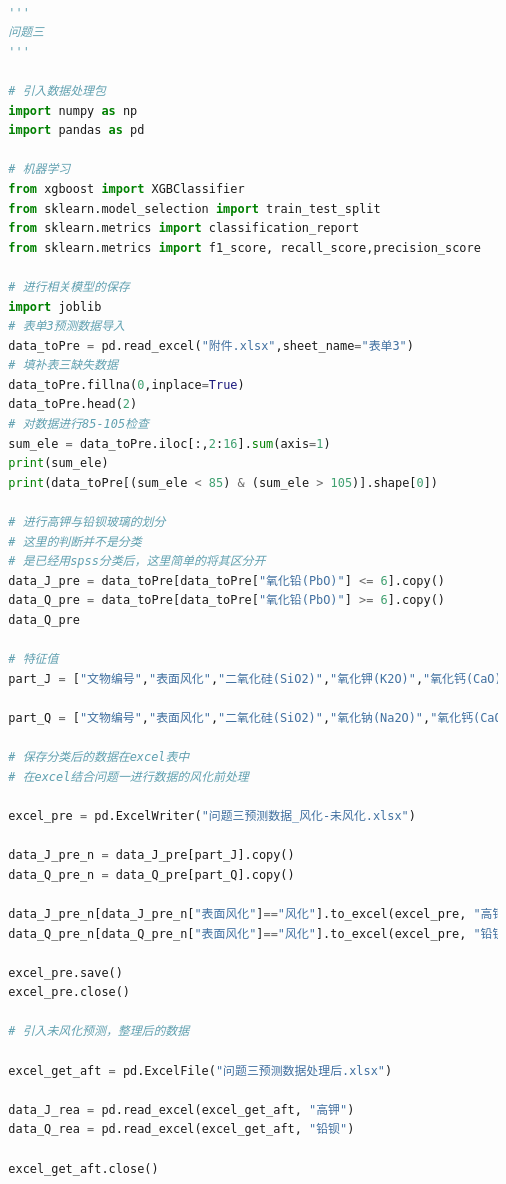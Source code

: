 \documentclass[withoutpreface,bwprint]{cumcmthesis} %
\begin{document}
\begin{appendices}
\begin{lstlisting}[language=python]
  
  '''
  问题三
  '''
  
  # 引入数据处理包
  import numpy as np
  import pandas as pd
  
  # 机器学习
  from xgboost import XGBClassifier
  from sklearn.model_selection import train_test_split
  from sklearn.metrics import classification_report
  from sklearn.metrics import f1_score, recall_score,precision_score
  
  # 进行相关模型的保存
  import joblib
  # 表单3预测数据导入
  data_toPre = pd.read_excel("附件.xlsx",sheet_name="表单3")
  # 填补表三缺失数据
  data_toPre.fillna(0,inplace=True)
  data_toPre.head(2)
  # 对数据进行85-105检查
  sum_ele = data_toPre.iloc[:,2:16].sum(axis=1)
  print(sum_ele)
  print(data_toPre[(sum_ele < 85) & (sum_ele > 105)].shape[0])
  
  # 进行高钾与铅钡玻璃的划分
  # 这里的判断并不是分类
  # 是已经用spss分类后，这里简单的将其区分开
  data_J_pre = data_toPre[data_toPre["氧化铅(PbO)"] <= 6].copy()
  data_Q_pre = data_toPre[data_toPre["氧化铅(PbO)"] >= 6].copy()
  data_Q_pre
  
  # 特征值
  part_J = ["文物编号","表面风化","二氧化硅(SiO2)","氧化钾(K2O)","氧化钙(CaO)","氧化铝(Al2O3)","氧化镁(MgO)","氧化铁(Fe2O3)","氧化铅(PbO)","五氧化二磷(P2O5)"]
  
  part_Q = ["文物编号","表面风化","二氧化硅(SiO2)","氧化钠(Na2O)","氧化钙(CaO)","氧化铝(Al2O3)","氧化铅(PbO)","五氧化二磷(P2O5)"]
  
  # 保存分类后的数据在excel表中
  # 在excel结合问题一进行数据的风化前处理
  
  excel_pre = pd.ExcelWriter("问题三预测数据_风化-未风化.xlsx")
  
  data_J_pre_n = data_J_pre[part_J].copy()
  data_Q_pre_n = data_Q_pre[part_Q].copy()
  
  data_J_pre_n[data_J_pre_n["表面风化"]=="风化"].to_excel(excel_pre, "高钾_风化")
  data_Q_pre_n[data_Q_pre_n["表面风化"]=="风化"].to_excel(excel_pre, "铅钡_风化")
  
  excel_pre.save()
  excel_pre.close()
  
  # 引入未风化预测，整理后的数据
  
  excel_get_aft = pd.ExcelFile("问题三预测数据处理后.xlsx")
  
  data_J_rea = pd.read_excel(excel_get_aft, "高钾")
  data_Q_rea = pd.read_excel(excel_get_aft, "铅钡")
  
  excel_get_aft.close()
  

\end{lstlisting}
\end{appendices}
\end{document}
